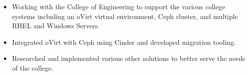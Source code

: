 \documentclass[]{deedy-resume-openfont}
\begin{document}
\begin{minipage}[t]{0.66\textwidth}
\vspace{-3mm}
\begin{itemize}
  \itemsep-4pt
  \item Working with the College of Engineering to support the various college systems including an oVirt virtual environment, Ceph cluster, and multiple RHEL and Windows Servers.
  \item Integrated oVirt with Ceph using Cinder and developed migration tooling.
  \item Researched and implemented various other solutions to better serve the needs of the college.
\end{itemize}
\vspace{-5mm}
\sectionsep

\vspace{-1mm}
\sectionsep

\sectionsep


\end{minipage}
\end{document}
